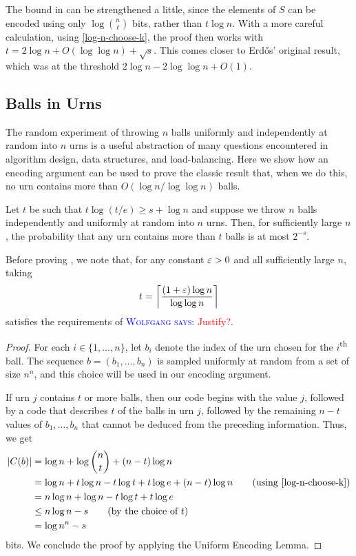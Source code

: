 \documentclass{patmorin}
\newcommand{\aremark}[3]{\textcolor{blue}{\textsc{#1 #2:}}
  \textcolor{red}{\textsf{#3}}}
\newcommand{\wolfgang}[2][says]{\aremark{Wolfgang}{#1}{#2}}
\begin{document}
\begin{rem}
  The bound in  can be strengthened a little,
  since the elements of $S$ can be encoded using only
  $\log\binom{n}{t}$ bits, rather than $t\log n$.  With a more careful
  calculation, using \eqref{log-n-choose-k}, the proof then works with
  $t = 2\log n +O(\log\log n) + \sqrt{s}$. This comes closer to Erdős'
  original result, which was at the threshold $2\log n - 2\log\log n +
  O(1)$.
\end{rem}


\subsection{Balls in Urns}

The random experiment of  throwing $n$ balls uniformly and
independently at random into $n$ urns is a useful abstraction of many
questions encountered in algorithm design, data structures, and 
load-balancing.  Here we
show how an encoding argument can be used to prove the classic result
that, when we do this, no urn contains more than $O(\log n/\log\log
n)$ balls.

\begin{thm}
  Let $t$ be such that $t\log(t/e) \ge s+\log n$ and suppose we throw
  $n$ balls independently and uniformly at random into $n$ urns. Then,
  for sufficiently large $n$, the probability that any urn contains
  more than $t$ balls is at most $2^{-s}$.
\end{thm}

Before proving , we note that, for any constant $\varepsilon >0$
and all sufficiently large $n$, taking
\[
  t = {\left\lceil \frac{(1+\varepsilon)\log n}{\log\log n} \right\rceil}
\] 
satisfies the requirements of  \wolfgang{Justify?}.

\begin{proof}
  For each $i\in\{1,\ldots,n\}$, let $b_i$ denote the index of the urn
  chosen for the $i$\textsuperscript{th} ball. The
  sequence $b = (b_1,\ldots,b_n)$ is sampled uniformly at random from a
  set of size $n^n$, and this choice will be used in our
  encoding argument.

  If urn $j$ contains $t$ or more balls, then our code
  begins with the value $j$, followed by a code that describes $t$ of
  the balls in urn $j$, followed by the remaining $n-t$ values of
  $b_1,\ldots,b_n$ that cannot be deduced from the preceding
  information.  Thus, we get
  \begin{align*}
    |C(b)| &= \log n + \log\binom{n}{t} + (n-t)\log n \\
           &= \log n + t\log n - t\log t + t\log e + (n-t)\log n
             \tag{using \eqref{log-n-choose-k}} \\
           & = n \log n + \log n - t\log t + t\log e \\
           & \le n \log n - s \tag{by the choice of $t$} \\
           & = \log n^n - s
  \end{align*}
  bits. We conclude the proof by applying the Uniform Encoding Lemma.
\end{proof}
\end{document}
